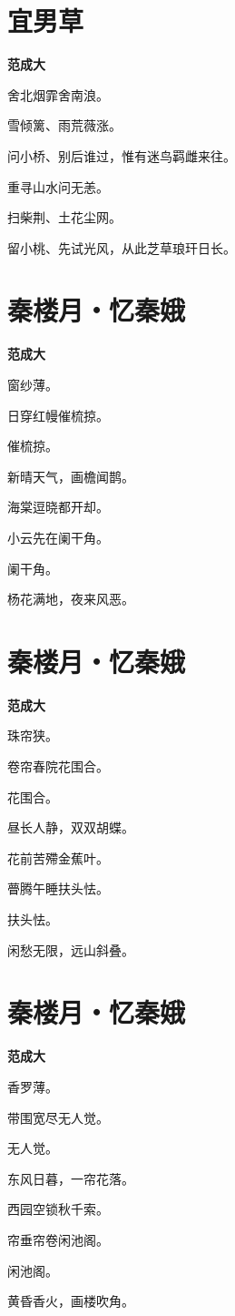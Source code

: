 \documentclass[12pt,a4paper]{ctexbook}
\begin{document}
\section{宜男草}
\textbf{范成大}\par\vspace{0.5em}
舍北烟霏舍南浪。\par
雪倾篱、雨荒薇涨。\par
问小桥、别后谁过，惟有迷鸟羁雌来往。\par
重寻山水问无恙。\par
扫柴荆、土花尘网。\par
留小桃、先试光风，从此芝草琅玕日长。\par

\section{秦楼月・忆秦娥}
\textbf{范成大}\par\vspace{0.5em}
窗纱薄。\par
日穿红幔催梳掠。\par
催梳掠。\par
新晴天气，画檐闻鹊。\par
海棠逗晓都开却。\par
小云先在阑干角。\par
阑干角。\par
杨花满地，夜来风恶。\par

\section{秦楼月・忆秦娥}
\textbf{范成大}\par\vspace{0.5em}
珠帘狭。\par
卷帘春院花围合。\par
花围合。\par
昼长人静，双双胡蝶。\par
花前苦殢金蕉叶。\par
瞢腾午睡扶头怯。\par
扶头怯。\par
闲愁无限，远山斜叠。\par

\section{秦楼月・忆秦娥}
\textbf{范成大}\par\vspace{0.5em}
香罗薄。\par
带围宽尽无人觉。\par
无人觉。\par
东风日暮，一帘花落。\par
西园空锁秋千索。\par
帘垂帘卷闲池阁。\par
闲池阁。\par
黄昏香火，画楼吹角。\par
\end{document}
